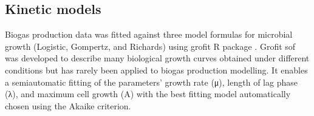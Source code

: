 \subsection{Kinetic models}
Biogas production data was fitted against three model formulas for microbial growth (Logistic, Gompertz, and Richards) using grofit R package \cite{Kahm_2010}. Grofit sof was developed to describe many biological growth curves obtained under different conditions but has rarely been applied to biogas production modelling. It enables a semiautomatic fitting of the parameters’ growth rate (μ), length of lag phase (λ), and maximum cell growth (A) with the best fitting model automatically chosen using the Akaike criterion.